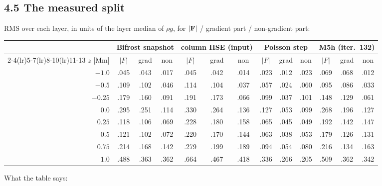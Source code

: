 \documentclass[10pt]{extarticle}
\begin{document}
\subsection*{4.5 The measured split}
RMS over each layer, in units of the layer median of $\rho g$, for $|\mathbf F|$ / gradient part / non-gradient part:
\begin{center}\small
\begin{tabular}{r ccc ccc ccc ccc}
\toprule
& \multicolumn{3}{c}{Bifrost snapshot} & \multicolumn{3}{c}{column HSE (input)} & \multicolumn{3}{c}{\textbf{Poisson step}} & \multicolumn{3}{c}{M5h (iter.\ 132)}\\
\cmidrule(lr){2-4}\cmidrule(lr){5-7}\cmidrule(lr){8-10}\cmidrule(lr){11-13}
$z$ [Mm] & $|F|$ & grad & non & $|F|$ & grad & non & $|F|$ & grad & non & $|F|$ & grad & non \\ \midrule
$-1.0$  & .045 & .043 & .017 & .045 & .042 & .014 & .023 & .012 & .023 & .069 & .068 & .012 \\
$-0.5$  & .109 & .102 & .046 & .114 & .104 & .037 & .057 & .024 & .060 & .095 & .086 & .033 \\
$-0.25$ & .179 & .160 & .091 & .191 & .173 & .066 & .099 & .037 & .101 & .148 & .129 & .061 \\
$0.0$   & .295 & .251 & .114 & .330 & .264 & .136 & .127 & .053 & .099 & .268 & .196 & .127 \\
$0.25$  & .118 & .106 & .069 & .228 & .180 & .158 & .065 & .045 & .049 & .192 & .142 & .147 \\
$0.5$   & .121 & .102 & .072 & .220 & .170 & .144 & .063 & .038 & .053 & .179 & .126 & .131 \\
$0.75$  & .214 & .168 & .142 & .279 & .199 & .189 & .094 & .054 & .080 & .216 & .134 & .163 \\
$1.0$   & .488 & .363 & .362 & .664 & .467 & .418 & .336 & .266 & .205 & .509 & .362 & .342 \\
\bottomrule
\end{tabular}
\end{center}
What the table says:
\end{document}
